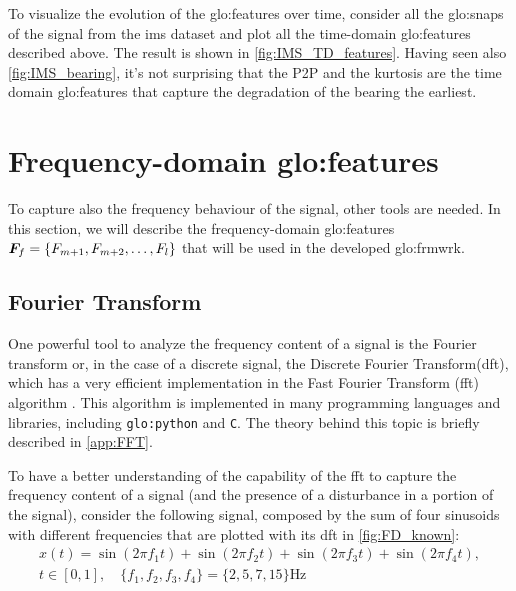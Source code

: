 To visualize the evolution of the \gls{glo:feature}s over time, consider all the \gls{glo:snap}s of the  signal from the \gls{ims} dataset and plot all the time-domain \gls{glo:feature}s described above. The result is shown in \autoref{fig:IMS_TD_features}. Having seen also \autoref{fig:IMS_bearing}, it's not surprising that the P2P and the kurtosis are the time domain \gls{glo:feature}s that capture the degradation of the bearing the earliest. 


\section{Frequency-domain \gls{glo:feature}s}

To capture also the frequency behaviour of the signal, other tools are needed. In this section, we will describe the frequency-domain \gls{glo:feature}s  $\bm{F}_f = \{F_{m+1}, F_{m+2}, \dots, F_l\}$ that will be used in the developed \gls{glo:frmwrk}.

\subsection{Fourier Transform}
\label{sec:FFT}

One powerful tool to analyze the frequency content of a signal is the Fourier transform or, in the case of a discrete signal, the Discrete Fourier Transform(\gls{dft}), which has a very efficient implementation in the Fast Fourier Transform (\gls{fft}) algorithm \cite{cooley1965algorithm}. This algorithm is implemented in many programming languages and libraries, including \texttt{\gls{glo:python}} and \texttt{C}. The theory behind this topic is briefly described in \autoref{app:FFT}. 

To have a better understanding of the capability of the \gls{fft} to capture the frequency content of a signal (and the presence of a disturbance in a portion of the signal), consider the following signal, composed by the sum of four sinusoids with different frequencies that are plotted with its \gls{dft} in \autoref{fig:FD_known}:
\begin{multline}
    x(t) = \sin(2\pi f_1 t) + \sin(2\pi f_2 t) + \sin(2\pi f_3 t) + \sin(2\pi f_4 t), \\
    t \in [0, 1], \quad \{f_1, f_2, f_3, f_4\} = \{2, 5, 7, 15\} \si{\Hz}
\end{multline}

